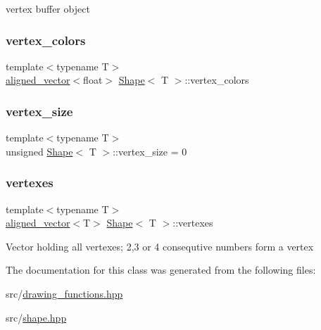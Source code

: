 vertex buffer object \mbox{\label{classShape_a1590ef02d7090f28d1ad312fd46f5030}} 
\subsubsection{\texorpdfstring{vertex\+\_\+colors}{vertex\_colors}}
{\footnotesize\ttfamily template$<$typename T$>$ \\
\mbox{\hyperlink{type__definitions_8hpp_accb98a876f193a416d9c8a02fe22d526}{aligned\+\_\+vector}}$<$float$>$ \mbox{\hyperlink{classShape}{Shape}}$<$ T $>$\+::vertex\+\_\+colors\hspace{0.3cm}{\ttfamily [protected]}}

\mbox{\label{classShape_a7cf9cc243cdd64215eca4d81704c7199}} 
\subsubsection{\texorpdfstring{vertex\+\_\+size}{vertex\_size}}
{\footnotesize\ttfamily template$<$typename T$>$ \\
unsigned \mbox{\hyperlink{classShape}{Shape}}$<$ T $>$\+::vertex\+\_\+size = 0\hspace{0.3cm}{\ttfamily [protected]}}

\mbox{\label{classShape_a50296217cf654fc7b756b67a2f0305c2}} 
\subsubsection{\texorpdfstring{vertexes}{vertexes}}
{\footnotesize\ttfamily template$<$typename T$>$ \\
\mbox{\hyperlink{type__definitions_8hpp_accb98a876f193a416d9c8a02fe22d526}{aligned\+\_\+vector}}$<$T$>$ \mbox{\hyperlink{classShape}{Shape}}$<$ T $>$\+::vertexes\hspace{0.3cm}{\ttfamily [protected]}}

Vector holding all vertexes; 2,3 or 4 consequtive numbers form a vertex 

The documentation for this class was generated from the following files\+:\begin{DoxyCompactItemize}
\item 
src/\mbox{\hyperlink{drawing__functions_8hpp}{drawing\+\_\+functions.\+hpp}}\item 
src/\mbox{\hyperlink{shape_8hpp}{shape.\+hpp}}\end{DoxyCompactItemize}
